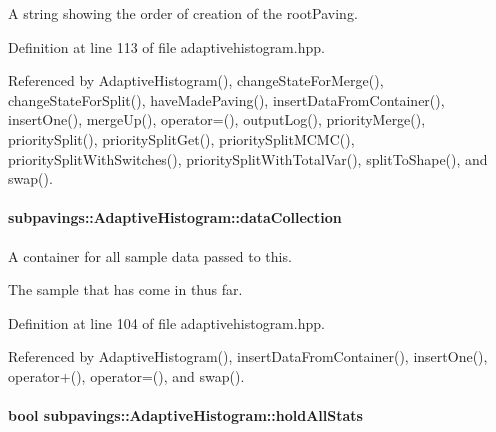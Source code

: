 \-A string showing the order of creation of the root\-Paving. 



\-Definition at line 113 of file adaptivehistogram.\-hpp.



\-Referenced by \-Adaptive\-Histogram(), change\-State\-For\-Merge(), change\-State\-For\-Split(), have\-Made\-Paving(), insert\-Data\-From\-Container(), insert\-One(), merge\-Up(), operator=(), output\-Log(), priority\-Merge(), priority\-Split(), priority\-Split\-Get(), priority\-Split\-M\-C\-M\-C(), priority\-Split\-With\-Switches(), priority\-Split\-With\-Total\-Var(), split\-To\-Shape(), and swap().

\hypertarget{classsubpavings_1_1AdaptiveHistogram_afb02d0a6fe2258620130b97b7901e214}{
\paragraph[{data\-Collection}]{ {\bf subpavings\-::\-Adaptive\-Histogram\-::data\-Collection}}}\label{classsubpavings_1_1AdaptiveHistogram_afb02d0a6fe2258620130b97b7901e214}


\-A container for all sample data passed to this. 

\-The sample that has come in thus far. 

\-Definition at line 104 of file adaptivehistogram.\-hpp.



\-Referenced by \-Adaptive\-Histogram(), insert\-Data\-From\-Container(), insert\-One(), operator+(), operator=(), and swap().

\hypertarget{classsubpavings_1_1AdaptiveHistogram_a3f9319019a75ea477804d02762602d17}{
\paragraph[{hold\-All\-Stats}]{\setlength{\rightskip}{0pt plus 5cm}bool {\bf subpavings\-::\-Adaptive\-Histogram\-::hold\-All\-Stats}}}\label{classsubpavings_1_1AdaptiveHistogram_a3f9319019a75ea477804d02762602d17}


